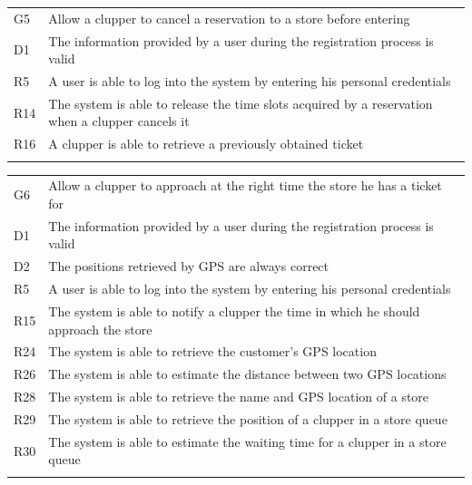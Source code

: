\documentclass[
]{article}
\begin{document}
\begin{longtable}[]{@{}
  >{\raggedright\arraybackslash}p{}
  >{\raggedright\arraybackslash}p{}@{}}
\toprule
G5 & Allow a clupper to cancel a reservation to a store before
entering \\ \addlinespace
\midrule
\endhead
D1 & The information provided by a user during the registration process
is valid \\ \addlinespace
R5 & A user is able to log into the system by entering his personal
credentials \\ \addlinespace
R14 & The system is able to release the time slots acquired by a
reservation when a clupper cancels it \\ \addlinespace
R16 & A clupper is able to retrieve a previously obtained
ticket \\ \addlinespace
\bottomrule
\end{longtable}

\begin{longtable}[]{@{}
  >{\raggedright\arraybackslash}p{}
  >{\raggedright\arraybackslash}p{}@{}}
\toprule
G6 & Allow a clupper to approach at the right time the store he has a
ticket for \\ \addlinespace
\midrule
\endhead
D1 & The information provided by a user during the registration process
is valid \\ \addlinespace
D2 & The positions retrieved by GPS are always correct \\ \addlinespace
R5 & A user is able to log into the system by entering his personal
credentials \\ \addlinespace
R15 & The system is able to notify a clupper the time in which he should
approach the store \\ \addlinespace
R24 & The system is able to retrieve the customer's GPS
location \\ \addlinespace
R26 & The system is able to estimate the distance between two GPS
locations \\ \addlinespace
R28 & The system is able to retrieve the name and GPS location of a
store \\ \addlinespace
R29 & The system is able to retrieve the position of a clupper in a
store queue \\ \addlinespace
R30 & The system is able to estimate the waiting time for a clupper in a
store queue \\ \addlinespace
\bottomrule
\end{longtable}
\end{document}
